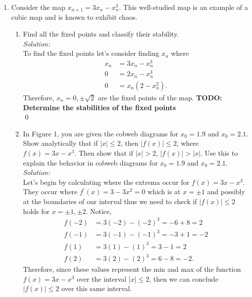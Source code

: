\documentclass[10pt]{amsart}
\theoremstyle{nonumberplain}
\begin{document}
\begin{enumerate}[label={\bf {\arabic*}:}]
\begin{enumerate}
\end{enumerate}

\item Consider the map $x_{n + 1} = 3x_n - x_n^3$.
This well-studied map is an example of a cubic map and is known to exhibit chaos. \\
\begin{enumerate}

\item Find all the fixed points and classify their stability. \\

\textit{Solution:} \\
To find the fixed points let's consider finding $x_n$ where
\begin{align*}
x_n &= 3x_n - x_n^3 \\
0 &= 2x_n - x_n^3 \\
0 &= x_n (2 - x_n^2).
\end{align*}
Therefore, $x_n = 0, \pm \sqrt{2}$ are the fixed points of the map.
\textbf{TODO: Determine the stabilities of the fixed points}\\
\qed \\

\item In Figure 1, you are given the cobweb diagrams for $x_0 = 1.9$ and $x_0 = 2.1$.
Show analytically that if $|x| \leq 2$, then $|f(x)| \leq 2$, where $f(x) = 3x - x^3$.
Then show that if $|x| > 2$, $|f(x)| > |x|$.
Use this to explain the behavior in cobweb diagrams for $x_0 = 1.9$ and $x_0 = 2.1$.  \\

\textit{Solution:} \\
Let's begin by calculating where the extrema occur for $f(x) = 3x - x^3$.
They occur where $f^\prime(x) = 3 -3x^2 = 0$ which is at $x = \pm 1$ and possibly at the boundaries of our interval thus we need to check if $|f(x)| \leq 2$ holds for $x = \pm 1, \pm 2$.
Notice,
\begin{align*}
f(-2) &= 3(-2) - (-2)^3 = -6 + 8 = 2 \\
f(-1) &= 3(-1) - (-1)^3 = -3 + 1 = - 2 \\
f(1) &= 3(1) - (1)^3 = 3 - 1 = 2 \\
f(2) &= 3(2) - (2)^3 = 6 - 8 = -2.
\end{align*}
Therefore, since these values represent the min and max of the function $f(x) = 3x - x^3$ over the interval $|x| \leq 2$, then we can conclude $|f(x)| \leq 2$ over this same interval. \\


\end{enumerate}
\end{enumerate}
\end{document}
